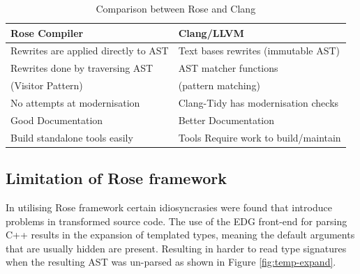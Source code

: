 \documentclass[bsc,frontabs,singlespacing,parskip,deptreport]{infthesis}
\begin{document}
\begin{table}[h]
    \begin{center}
        \begin{tabular}{| l | l |}
            \hline
             \textbf{Rose Compiler}               & \textbf{Clang/LLVM}                 \\ \hline
             Rewrites are applied directly to AST & Text bases rewrites (immutable AST) \\ \hline
             Rewrites done by traversing AST      & AST matcher functions               \\ 
             (Visitor Pattern)                    & (pattern matching)                  \\ \hline
             No attempts at modernisation         & Clang-Tidy has modernisation checks \\ \hline
             Good Documentation                   & Better Documentation                \\ \hline
             Build standalone tools easily        & Tools Require work to build/maintain\\ \hline
        \end{tabular}
        \caption{Comparison between Rose and Clang }
        \label{tab:cmp-rose-clang}
    \end{center}
\end{table}
    



\subsection{Limitation of Rose framework}
In utilising Rose framework certain idiosyncrasies were found that introduce problems in transformed source code. The use of the EDG front-end for parsing C++ results in the expansion of templated types, meaning the default arguments that are usually hidden are present. Resulting in harder to read type signatures when the resulting AST was un-parsed as shown in Figure \ref{fig:temp-expand}. 
\end{document}
